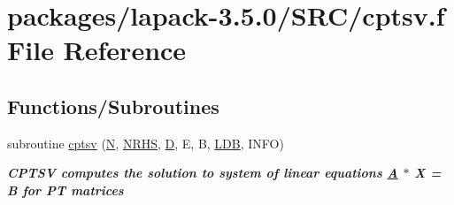 \hypertarget{cptsv_8f}{}\section{packages/lapack-\/3.5.0/\+S\+R\+C/cptsv.f File Reference}
\label{cptsv_8f}
\subsection*{Functions/\+Subroutines}
\begin{DoxyCompactItemize}
\item 
subroutine \hyperlink{group__complexPTsolve_gab2cf9c94b022c5350b6c5b6bcd2744e8}{cptsv} (\hyperlink{polmisc_8c_a0240ac851181b84ac374872dc5434ee4}{N}, \hyperlink{example__user_8c_aa0138da002ce2a90360df2f521eb3198}{N\+R\+H\+S}, \hyperlink{odrpack_8h_a7dae6ea403d00f3687f24a874e67d139}{D}, E, B, \hyperlink{example__user_8c_a50e90a7104df172b5a89a06c47fcca04}{L\+D\+B}, I\+N\+F\+O)
\begin{DoxyCompactList}\small\item\em {\bfseries  C\+P\+T\+S\+V computes the solution to system of linear equations \hyperlink{classA}{A} $\ast$ X = B for P\+T matrices} \end{DoxyCompactList}\end{DoxyCompactItemize}
